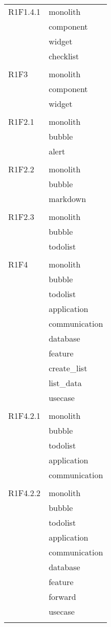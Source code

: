 \begin{center}
\begin{longtable}{|p{7cm}|p{7cm}|}
		R1F1.4.1 & monolith \\ & component \\ & widget \\ & checklist \\ & \\ \hline
		R1F3 & monolith \\ & component \\ & widget \\ & \\ \hline
		R1F2.1 & monolith \\ & bubble \\ & alert \\ & \\ \hline
		R1F2.2 & monolith \\ & bubble \\ & markdown \\ & \\ \hline
		R1F2.3 & monolith \\ & bubble \\ & todolist \\ & \\ \hline
		R1F4 & monolith \\ & bubble \\ & todolist \\ & application \\ & communication \\ & database \\ & feature \\ & create\_list \\ & list\_data \\ & usecase \\ & \\ \hline
		R1F4.2.1 & monolith \\ & bubble \\ & todolist \\ & application \\ & communication \\ & \\ \hline
		R1F4.2.2 & monolith \\ & bubble \\ & todolist \\ & application \\ & communication \\ & database \\ & feature \\ & forward \\ & usecase \\ & \\ \hline

\end{longtable}
\end{center}
